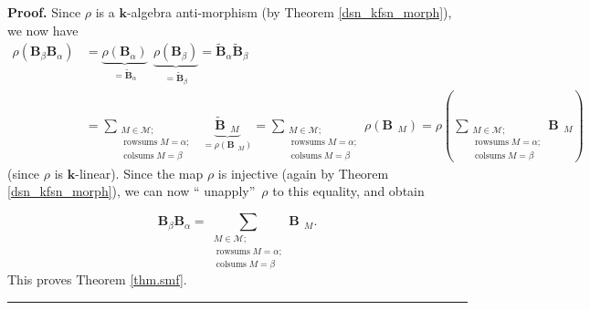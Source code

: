\documentclass[12pt]{article}
\theoremstyle{definition}%
\theoremstyle{definition}%
\theoremstyle{remark}%
\newcommand{\kk}{\mathbf{k}}
\newcommand{\BB}{\mathbf{B}}
\newcommand{\BBt}{\widetilde{\mathbf{B}}}
\newcommand{\CM}{\mathcal{M}}
\newcommand{\rowsums}{\operatorname{rowsums}}
\newcommand{\colsums}{\operatorname{colsums}}
\newcommand{\readb}{\mathop{\overline{\operatorname{read}}}}
\newenvironment{proof}[1][Proof]{\noindent\textbf{#1.} }{\ \rule{0.5em}{0.5em}}
\begin{document}
\begin{proof}
Since $\rho$ is a $\kk$-algebra anti-morphism (by Theorem
\ref{dsn_kfsn_morph}), we now have
\begin{align*}
\rho\left(  \BB_{\beta}\BB_{\alpha}\right)   &
=\underbrace{\rho\left(  \BB_{\alpha}\right)  }_{=
\BBt_{\alpha}}\ \ \underbrace{\rho\left(  \BB_{\beta}\right)
}_{=\BBt_{\beta}}=\BBt_{\alpha
}\BBt_{\beta}\\
&  =\sum_{\substack{M\in\CM ;\\\rowsums M=\alpha
;\\\colsums M=\beta}}
\ \ \underbrace{\BBt_{\readb M}}_{=\rho\left(  \BB_{\readb M}\right)  }
=\sum_{\substack{M\in\CM ;\\\rowsums M=\alpha;\\
\colsums M=\beta}}\rho\left(  \BB_{\readb M}\right)
=\rho\left(  \sum_{\substack{M\in\CM ;\\\rowsums M
=\alpha;\\\colsums M=\beta}}\BB_{\readb M}\right)
\end{align*}
(since $\rho$ is $\kk$-linear). Since the map $\rho$ is injective
(again by Theorem \ref{dsn_kfsn_morph}), we can now \textquotedblleft
unapply\textquotedblright\ $\rho$ to this equality, and obtain

\[
\BB_{\beta}\BB_{\alpha} = \sum_{\substack{M\in\CM;\\
\rowsums M=\alpha;\\\colsums M=\beta}} \BB_{\readb M}.
\]
This proves Theorem \ref{thm.smf}.
\end{proof}

\printbibliography
\end{document}
